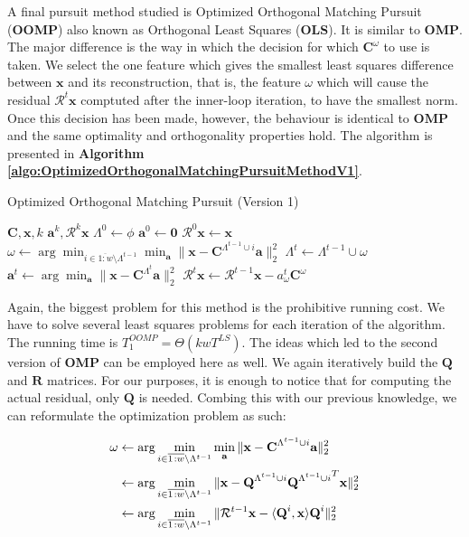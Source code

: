 \documentclass[12pt,a4paper,oneside,english]{UPBThesis}
\newcommand{\hcrange}[2]{\overline{{#1}\colon\!\!{#2}}}
\begin{document}
A final pursuit method studied is Optimized Orthogonal Matching Pursuit (\textbf{OOMP}) \cite{optimizedorthopursuit,orthogonalls} also known as Orthogonal Least Squares (\textbf{OLS}). It is similar to \textbf{OMP}. The major difference is the way in which the decision for which $\textbf{C}^\omega$ to use is taken. We select the one feature which gives the smallest least squares difference between $\textbf{x}$ and its reconstruction, that is, the feature $\omega$ which will cause the residual $\mathcal{R}^t\textbf{x}$ comptuted after the inner-loop iteration, to have the smallest norm. Once this decision has been made, however, the behaviour is identical to $\textbf{OMP}$ and the same optimality and orthogonality properties hold. The algorithm is presented in \textbf{Algorithm \ref{algo:OptimizedOrthogonalMatchingPursuitMethodV1}}.

\begin{algorithm}
\caption{Optimized Orthogonal Matching Pursuit (Version 1)}
\label{algo:OptimizedOrthogonalMatchingPursuitMethodV1}
\begin{algorithmic}
\Require $\textbf{C},\textbf{x},k$
\Ensure $\textbf{a}^k,\mathcal{R}^k\textbf{x}$
\State $\Lambda^0 \gets \phi$
\State $\textbf{a}^0 \gets \textbf{0}$
\State $\mathcal{R}^0\textbf{x} \gets \textbf{x}$
\For {$t = \hcrange{1}{k}$}
\State $\omega \gets \arg \min_{i \in \hcrange{1}{w} \setminus \Lambda^{t-1}} \min_{\textbf{a}} {\| \textbf{x} - \textbf{C}^{\Lambda^{t-1} \cup i}\textbf{a} \|_2^2}$
\State $\Lambda^t \gets \Lambda^{t-1} \cup \omega$
\State $\textbf{a}^t \gets \arg\min_{\textbf{a}} {\| \textbf{x} - \textbf{C}^{\Lambda^t}\textbf{a} \|_2^2}$
\State $\mathcal{R}^t\textbf{x} \gets \mathcal{R}^{t-1}\textbf{x} - a_\omega^t\textbf{C}^\omega$
\EndFor
\end{algorithmic}
\end{algorithm}

Again, the biggest problem for this method is the prohibitive running cost. We have to solve several least squares problems for each iteration of the algorithm. The running time is $T_1^{OOMP} = \Theta(kwT^{LS})$. The ideas which led to the second version of \textbf{OMP} can be employed here as well. We again iteratively build the $\textbf{Q}$ and $\textbf{R}$ matrices. For our purposes, it is enough to notice that for computing the actual residual, only $\textbf{Q}$ is needed. Combing this with our previous knowledge, we can reformulate the optimization problem as such:

\begin{align*}
\omega & \gets \arg\min_{i \in \hcrange{1}{w} \setminus \Lambda^{t-1}} \min_\textbf{a} \| \textbf{x} - \textbf{C}^{\Lambda^{t-1} \cup i}\textbf{a} \|_2^2 \\
& \gets \arg\min_{i \in \hcrange{1}{w} \setminus \Lambda^{t-1}} \| \textbf{x} - \textbf{Q}^{\Lambda^{t-1} \cup i}{\textbf{Q}^{\Lambda^{t-1} \cup i}}^T\textbf{x} \|_2^2 \\
& \gets \arg\min_{i \in \hcrange{1}{w} \setminus \Lambda^{t-1}} \| \mathcal{R}^{t-1}\textbf{x} - \langle \textbf{Q}^i, \textbf x \rangle \textbf{Q}^i \|_2^2
\end{align*}
\end{document}
